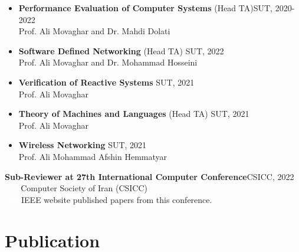 \documentclass[11pt]{article}
\begin{document}
\begin{itemize}
	


	\item \textbf{Performance Evaluation of Computer Systems}  (Head TA)\hfill SUT, 2020-2022
		\\ Prof. Ali Movaghar and Dr. Mahdi Dolati \vspace{-2mm} \href{https://scholar.google.com/citations?user=b7A2CXYAAAAJ&hl=en&oi=ao}{\small \faExternalLink}
	\item \textbf{Software Defined Networking} (Head TA) \hfill SUT, 2022
		\\ Prof. Ali Movaghar and Dr. Mohammad Hosseini \vspace{-2mm} \href{https://scholar.google.com/citations?user=iRO-DVoAAAAJ&hl=en&oi=ao}{\small \faExternalLink}
	\item \textbf{Verification of Reactive Systems} \hfill SUT, 2021
		\\ Prof. Ali Movaghar \vspace{-2mm}
			\item \textbf{Theory of Machines and Languages} (Head TA) \hfill SUT, 2021
		\\ Prof. Ali Movaghar \vspace{-2mm}
			\item \textbf{Wireless Networking} \hfill SUT, 2021
	\\ Prof. Ali Mohammad Afshin Hemmatyar \vspace{-2mm} \href{https://scholar.google.com/citations?user=wob0AskAAAAJ&hl=en&oi=ao}{\small \faExternalLink}




\end{itemize}

\hspace{-7mm}\textbf{Sub-Reviewer at 27th International Computer Conference}\hfill CSICC, 2022 \\
  \textcolor{white}{iiiiiii}Computer Society of Iran (CSICC) \href{http://csi.org.ir/csicc2022/index-2.html}{\small \faExternalLink}\\ \textcolor{white}{iiiiii} IEEE website published papers from this conference. \href{https://ieeexplore.ieee.org/xpl/conhome/9780464/proceeding}{\small \faExternalLink}
  
  
  \section {Publication}
  
\end{document}
